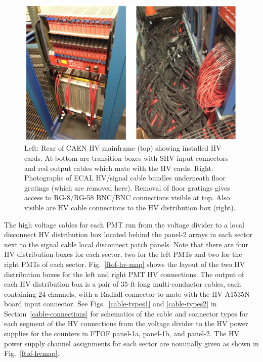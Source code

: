\documentclass[letterpaper,10pt]{article}
\begin{document}
\begin{figure}[htbp]
  \centering
  \includegraphics[width= 5in, keepaspectratio = true]{Cable-routing}
  \vspace{2mm}
  \caption{Left: Rear of CAEN HV mainframe (top) showing installed HV cards.  At bottom are transition boxes with SHV input connectors and red output cables which mate with the HV cards.  Right: Photographs of ECAL HV/signal cable bundles underneath floor gratings (which are removed here). Removal of floor gratings gives access to RG-8/RG-58 BNC/BNC connections visible at top.  Also visible are HV cable connections to the HV distribution box (right).}
  \label{fc-layout-3} 
\end{figure}



The high voltage cables for each PMT run from the voltage divider to a local disconnect HV distribution
box located behind the panel-2 arrays in each sector next to the signal cable local disconnect patch
panels. Note that there are four HV distribution boxes for each sector, two for the left PMTs and two
for the right PMTs of each sector. Fig.~\ref{ftof-hv-map} shows the layout of the two HV distribution 
boxes for the left and right PMT HV connections. The output of each HV distribution box is a pair of
35-ft-long multi-conductor cables, each containing 24-channels, with a Radiall connector to mate 
with the HV A1535N board input connector. See Figs.~\ref{cable-types1} and \ref{cable-types2} in 
Section~\ref{cable-connections} for schematics of the cable and connector types for each segment of the 
HV connections from the voltage divider to the HV power supplies for the counters in FTOF panel-1a, 
panel-1b, and panel-2. The HV power supply channel assignments for each sector are nominally given as 
shown in Fig.~\ref{ftof-hvmap}.
\end{document}
